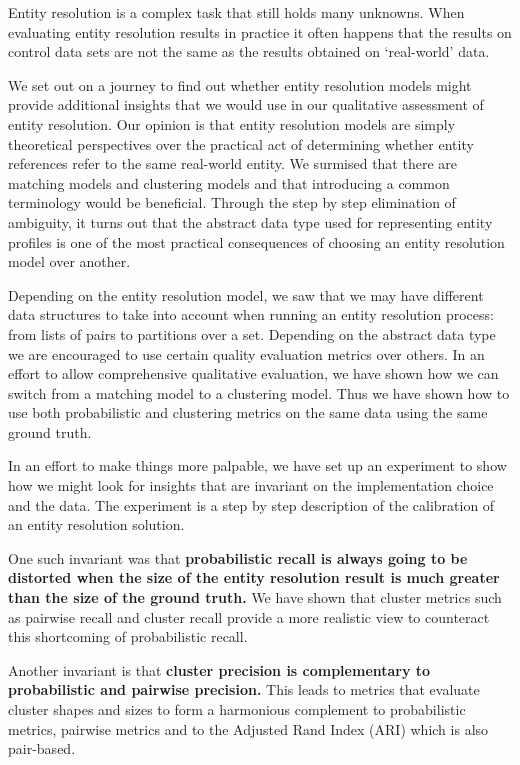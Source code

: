 \documentclass[journal]{IEEEtran}
\begin{document}
    Entity resolution is a complex task that still holds many unknowns.
    When evaluating entity resolution results in practice it often happens that
    the results on control data sets are not the same as the results obtained
    on `real-world' data.
    
    We set out on a journey to find out whether entity resolution models might
    provide additional insights that we would use in our qualitative assessment
    of entity resolution.
    Our opinion is that entity resolution models are simply theoretical
    perspectives over the practical act of determining whether entity references
    refer to the same real-world entity.
    We surmised that there are matching models and clustering models and that
    introducing a common terminology would be beneficial.
    Through the step by step elimination of ambiguity, it turns out that the
    abstract data type used for representing entity profiles is one of the most
    practical consequences of choosing an entity resolution model over another.

    Depending on the entity resolution model, we saw that we may have different
    data structures to take into account when running an entity resolution
    process: from lists of pairs to partitions over a set.
    Depending on the abstract data type we are encouraged to use certain quality
    evaluation metrics over others.
    In an effort to allow comprehensive qualitative evaluation, we have shown
    how we can switch from a matching model to a clustering model.
    Thus we have shown how to use both probabilistic and clustering metrics on
    the same data using the same ground truth.

    In an effort to make things more palpable, we have set up an experiment to
    show how we might look for insights that are invariant on the implementation
    choice and the data.
    The experiment is a step by step description of the calibration of an entity
    resolution solution.
    
    One such invariant was that \textbf{probabilistic recall is always going to
    be distorted when the size of the entity resolution result is much greater
    than the size of the ground truth.}
    We have shown that cluster metrics such as pairwise recall and cluster
    recall provide a more realistic view to counteract this shortcoming of
    probabilistic recall.

    Another invariant is that \textbf{cluster precision is complementary to
    probabilistic and pairwise precision.}
    This leads to metrics that evaluate cluster shapes and sizes to form a
    harmonious complement to probabilistic metrics, pairwise metrics and to the
    Adjusted Rand Index (ARI) which is also pair-based.
    
\end{document}
